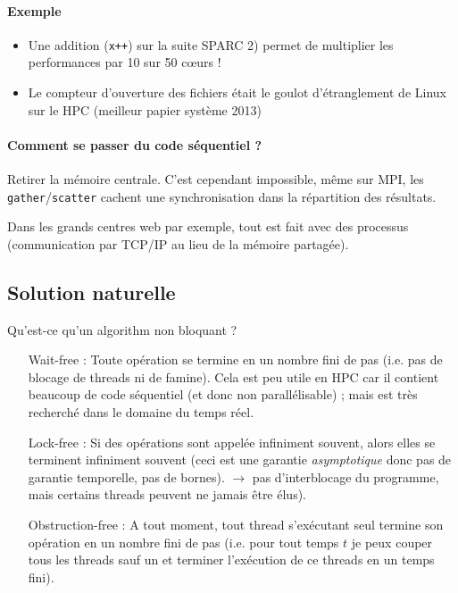 \documentclass{article}
\begin{document}
\paragraph{Exemple}
\begin{itemize}
\item Une addition (\texttt{x++}) sur la suite SPARC 2) permet de multiplier les performances par 10 sur 50 cœurs !
\item Le compteur d'ouverture des fichiers était le goulot d'étranglement de Linux sur le HPC (meilleur papier système 2013)
\end{itemize}

\paragraph{Comment se passer du code séquentiel ?}
Retirer la mémoire centrale. C'est cependant impossible, même sur MPI, les \texttt{gather}/\texttt{scatter} cachent une synchronisation dans la répartition des résultats.


Dans les grands centres web par exemple, tout est fait avec des processus (communication par TCP/IP au lieu de la mémoire partagée).

\subsection{Solution naturelle}
Qu'est-ce qu'un algorithm non bloquant ?

\begin{itemize}
\item[Wait-free :] Toute opération se termine en un nombre fini de pas (i.e. pas de blocage de threads ni de famine). Cela est peu utile en HPC car il contient beaucoup de code séquentiel (et donc non parallélisable) ; mais est très recherché dans le domaine du temps réel.
\item[Lock-free :] Si des opérations sont appelée infiniment souvent, alors elles se terminent infiniment souvent (ceci est une garantie \emph{asymptotique} donc pas de garantie temporelle, pas de bornes). $\to$ pas d'interblocage du programme, mais certains threads peuvent ne jamais être élus).
\item[Obstruction-free :] A tout moment, tout thread s'exécutant seul termine son opération en un nombre fini de pas (i.e. pour tout temps $t$ je peux couper tous les threads sauf un et terminer l'exécution de ce threads en un temps fini).
\end{itemize}
\bigskip
\end{document}
